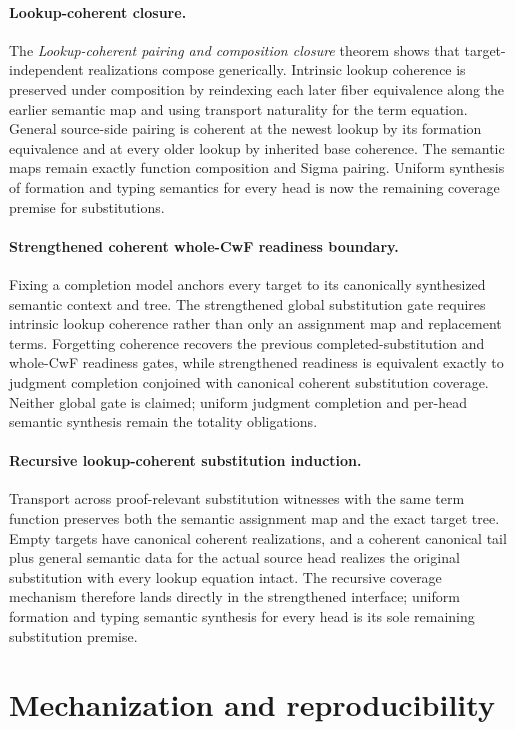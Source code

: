 \documentclass[11pt]{article}
\theoremstyle{definition}
\begin{document}
\paragraph{Lookup-coherent closure.}
The \emph{Lookup-coherent pairing and composition closure} theorem shows that
target-independent realizations compose generically. Intrinsic lookup
coherence is preserved under composition by reindexing each later fiber
equivalence along the earlier semantic map and using transport naturality for
the term equation. General source-side pairing is coherent at the newest
lookup by its formation equivalence and at every older lookup by inherited base
coherence. The semantic maps remain exactly function composition and Sigma
pairing. Uniform synthesis of formation and typing semantics for every head is
now the remaining coverage premise for substitutions.

\paragraph{Strengthened coherent whole-CwF readiness boundary.}
Fixing a completion model anchors every target to its canonically synthesized
semantic context and tree. The strengthened global substitution gate requires
intrinsic lookup coherence rather than only an assignment map and replacement
terms. Forgetting coherence recovers the previous completed-substitution and
whole-CwF readiness gates, while strengthened readiness is equivalent exactly
to judgment completion conjoined with canonical coherent substitution
coverage. Neither global gate is claimed; uniform judgment completion and
per-head semantic synthesis remain the totality obligations.

\paragraph{Recursive lookup-coherent substitution induction.}
Transport across proof-relevant substitution witnesses with the same term
function preserves both the semantic assignment map and the exact target tree.
Empty targets have canonical coherent realizations, and a coherent canonical
tail plus general semantic data for the actual source head realizes the
original substitution with every lookup equation intact. The recursive
coverage mechanism therefore lands directly in the strengthened interface;
uniform formation and typing semantic synthesis for every head is its sole
remaining substitution premise.

\section{Mechanization and reproducibility}
\end{document}
